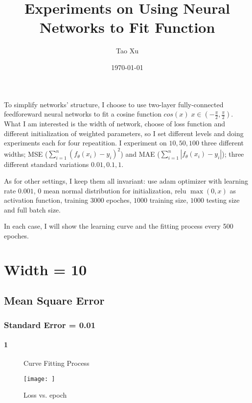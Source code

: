 \documentclass[12pt]{article}
\title{Experiments on Using Neural Networks to Fit Function}
\author{Tao Xu}
\date{\today}
\theoremstyle{remark}
\begin{document}
	\maketitle
	\tableofcontents
	

	\newpage

	To simplify networks' structure, I choose to use two-layer fully-connected feedforeward neural networks to fit a 
	cosine function $cos(x)\; x\in(-\frac{\pi}{2},\frac{\pi}{2})$. 
	What I am interested is the width of network, choose of loss function and different initialization of weighted
	parameters, so I set different levels and doing experiments each for four repeatition. I experiment on $10,50,100$
	three different widths; MSE ($\sum\limits_{i=1}^{n}(f_\theta(x_i)-y_i)^2$) and MAE ($\sum\limits_{i=1}^{n}\left|f_\theta(x_i)-y_i\right|$);
	three different standard variations $0.01,0.1,1$.
	
	As for other settings, I keep them all invariant: use adam optimizer with learning rate $0.001$, 0 mean normal 
	distribution for initialization, relu $\operatorname{max}(0,x)$ as activation function, training $3000$ epoches,
	$1000$ training size, $1000$ testing size and full batch size.

	In each case, I will show the learning curve and the fitting process every 500 epoches.

	\section{Width = 10}
		\subsection{Mean Square Error}
			\subsubsection{Standard Error = 0.01}
			\paragraph{1}
			\begin{figure}[H]
				\centering  
				\subfigure[epoch=0]{
					\texttt{[image: ]}}
				\subfigure[epoch=500]{
					\texttt{[image: ]}}
				\subfigure[epoch=1000]{
					\texttt{[image: ]}}
				\subfigure[epoch=1500]{
					\texttt{[image: ]}}
				\subfigure[epoch=2000]{
					\texttt{[image: ]}}
				\subfigure[epoch=2500]{
					\texttt{[image: ]}}
				\caption{Curve Fitting Process}
				\label{}
			\end{figure}
			\begin{figure}[h]
				\centering
				\texttt{[image: ]}
				\caption{Loss vs. epoch}
			\end{figure}
\end{document}

